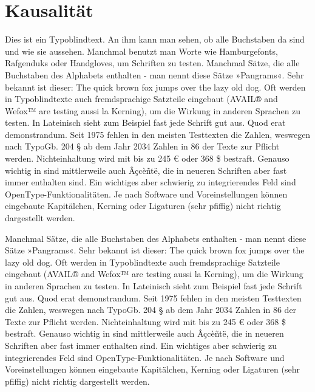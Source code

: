 \documentclass[
a5paper,
10pt, 
onecolumn,
openany,
]{memoir}
\begin{document}
\thispagestyle{empty}
\listoftables
\cleartooddpage

\appendix

\chapter{Kausalität}

Dies ist ein Typoblindtext. An ihm kann man sehen, ob alle Buchstaben da sind und wie sie aussehen. Manchmal benutzt man Worte wie Hamburgefonts, Rafgenduks oder Handgloves, um Schriften zu testen. Manchmal Sätze, die alle Buchstaben des Alphabets enthalten - man nennt diese Sätze »Pangrams«. Sehr bekannt ist dieser: The quick brown fox jumps over the lazy old dog. Oft werden in Typoblindtexte auch fremdsprachige Satzteile eingebaut (AVAIL® and Wefox™ are testing aussi la Kerning), um die Wirkung in anderen Sprachen zu testen. In Lateinisch sieht zum Beispiel fast jede Schrift gut aus. Quod erat demonstrandum. Seit 1975 fehlen in den meisten Testtexten die Zahlen, weswegen nach TypoGb. 204 § ab dem Jahr 2034 Zahlen in 86 der Texte zur Pflicht werden. Nichteinhaltung wird mit bis zu 245 € oder 368 \$ bestraft. Genauso wichtig in sind mittlerweile auch Âçcèñtë, die in neueren Schriften aber fast immer enthalten sind. Ein wichtiges aber schwierig zu integrierendes Feld sind OpenType-Funktionalitäten. Je nach Software und Voreinstellungen können eingebaute Kapitälchen, Kerning oder Ligaturen (sehr pfiffig) nicht richtig dargestellt werden.

Manchmal Sätze, die alle Buchstaben des Alphabets enthalten - man nennt diese Sätze »Pangrams«. Sehr bekannt ist dieser: The quick brown fox jumps over the lazy old dog. Oft werden in Typoblindtexte auch fremdsprachige Satzteile eingebaut (AVAIL® and Wefox™ are testing aussi la Kerning), um die Wirkung in anderen Sprachen zu testen. In Lateinisch sieht zum Beispiel fast jede Schrift gut aus. Quod erat demonstrandum. Seit 1975 fehlen in den meisten Testtexten die Zahlen, weswegen nach TypoGb. 204 § ab dem Jahr 2034 Zahlen in 86 der Texte zur Pflicht werden. Nichteinhaltung wird mit bis zu 245 € oder 368 \$ bestraft. Genauso wichtig in sind mittlerweile auch Âçcèñtë, die in neueren Schriften aber fast immer enthalten sind. Ein wichtiges aber schwierig zu integrierendes Feld sind OpenType-Funktionalitäten. Je nach Software und Voreinstellungen können eingebaute Kapitälchen, Kerning oder Ligaturen (sehr pfiffig) nicht richtig dargestellt werden.

\backmatter
\end{document}

